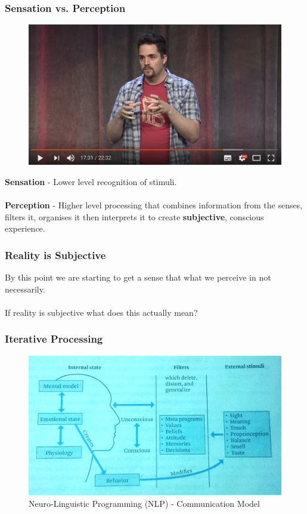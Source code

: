 \begin{frame}
	\frametitle{Sensation vs. Perception}	
	\begin{figure}
		\href{https://youtu.be/Ebwtq1HZJ2A?t=1051}{ \includegraphics[scale=.17]{assets/sensation}  }
	\end{figure}
	\textbf{Sensation} - Lower level recognition of stimuli. \\~\\
	\textbf{Perception} - Higher level processing that combines information from the senses, filters it, organises it then interprets it to create \textbf{subjective}, conscious experience. 
\end{frame}


\begin{frame}
	\frametitle{Reality is Subjective}
	By this point we are starting to get a sense that what we perceive in not necessarily. \\~\\ \pause
	If reality is subjective what does this actually mean?
\end{frame}

\begin{frame}
	\frametitle{Iterative Processing}
	
\end{frame}


\begin{frame}
	\begin{figure}
		 \includegraphics[scale=.5]{assets/nlp}
		 \caption{ Neuro-Linguistic Programming (NLP) - Communication Model }
		 
	\end{figure}
\end{frame}


